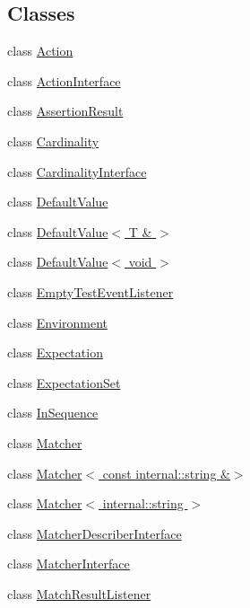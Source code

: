 \subsection*{Classes}
\begin{DoxyCompactItemize}
\item 
class \hyperlink{classtesting_1_1Action}{Action}
\item 
class \hyperlink{classtesting_1_1ActionInterface}{Action\+Interface}
\item 
class \hyperlink{classtesting_1_1AssertionResult}{Assertion\+Result}
\item 
class \hyperlink{classtesting_1_1Cardinality}{Cardinality}
\item 
class \hyperlink{classtesting_1_1CardinalityInterface}{Cardinality\+Interface}
\item 
class \hyperlink{classtesting_1_1DefaultValue}{Default\+Value}
\item 
class \hyperlink{classtesting_1_1DefaultValue_3_01T_01_6_01_4}{Default\+Value$<$ T \& $>$}
\item 
class \hyperlink{classtesting_1_1DefaultValue_3_01void_01_4}{Default\+Value$<$ void $>$}
\item 
class \hyperlink{classtesting_1_1EmptyTestEventListener}{Empty\+Test\+Event\+Listener}
\item 
class \hyperlink{classtesting_1_1Environment}{Environment}
\item 
class \hyperlink{classtesting_1_1Expectation}{Expectation}
\item 
class \hyperlink{classtesting_1_1ExpectationSet}{Expectation\+Set}
\item 
class \hyperlink{classtesting_1_1InSequence}{In\+Sequence}
\item 
class \hyperlink{classtesting_1_1Matcher}{Matcher}
\item 
class \hyperlink{classtesting_1_1Matcher_3_01const_01internal_1_1string_01_6_4}{Matcher$<$ const internal\+::string \&$>$}
\item 
class \hyperlink{classtesting_1_1Matcher_3_01internal_1_1string_01_4}{Matcher$<$ internal\+::string $>$}
\item 
class \hyperlink{classtesting_1_1MatcherDescriberInterface}{Matcher\+Describer\+Interface}
\item 
class \hyperlink{classtesting_1_1MatcherInterface}{Matcher\+Interface}
\item 
class \hyperlink{classtesting_1_1MatchResultListener}{Match\+Result\+Listener}
\item 

\end{DoxyCompactItemize}
